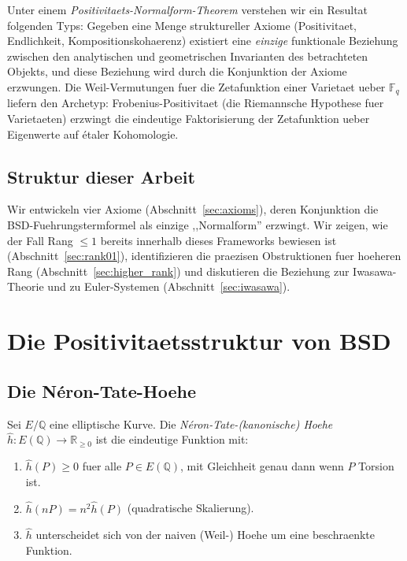 \documentclass[aps,prd,twocolumn,superscriptaddress,nofootinbib]{revtex4-2}
\theoremstyle{definition}
\theoremstyle{remark}
\begin{document}
Unter einem \textit{Positivitaets-Normalform-Theorem} verstehen wir ein Resultat folgenden Typs: Gegeben eine Menge struktureller Axiome (Positivitaet, Endlichkeit, Kompositionskohaerenz) existiert eine \textit{einzige} funktionale Beziehung zwischen den analytischen und geometrischen Invarianten des betrachteten Objekts, und diese Beziehung wird durch die Konjunktion der Axiome erzwungen. Die Weil-Vermutungen fuer die Zetafunktion einer Varietaet ueber $\mathbb{F}_q$ liefern den Archetyp: Frobenius-Positivitaet (die Riemannsche Hypothese fuer Varietaeten) erzwingt die eindeutige Faktorisierung der Zetafunktion ueber Eigenwerte auf \'etaler Kohomologie.

\subsection{Struktur dieser Arbeit}

Wir entwickeln vier Axiome (Abschnitt~\ref{sec:axioms}), deren Konjunktion die BSD-Fuehrungstermformel als einzige ,,Normalform'' erzwingt. Wir zeigen, wie der Fall Rang $\leq 1$ bereits innerhalb dieses Frameworks bewiesen ist (Abschnitt~\ref{sec:rank01}), identifizieren die praezisen Obstruktionen fuer hoeheren Rang (Abschnitt~\ref{sec:higher_rank}) und diskutieren die Beziehung zur Iwasawa-Theorie und zu Euler-Systemen (Abschnitt~\ref{sec:iwasawa}).


\section{Die Positivitaetsstruktur von BSD}
\label{sec:positivity}

\subsection{Die N\'eron-Tate-Hoehe}

Sei $E/\mathbb{Q}$ eine elliptische Kurve. Die \textit{N\'eron-Tate-(kanonische) Hoehe} $\hat{h}: E(\mathbb{Q}) \to \mathbb{R}_{\geq 0}$ ist die eindeutige Funktion mit:
\begin{enumerate}
\item $\hat{h}(P) \geq 0$ fuer alle $P \in E(\mathbb{Q})$, mit Gleichheit genau dann wenn $P$ Torsion ist.
\item $\hat{h}(nP) = n^2 \hat{h}(P)$ (quadratische Skalierung).
\item $\hat{h}$ unterscheidet sich von der naiven (Weil-) Hoehe um eine beschraenkte Funktion.
\end{enumerate}
\end{document}
